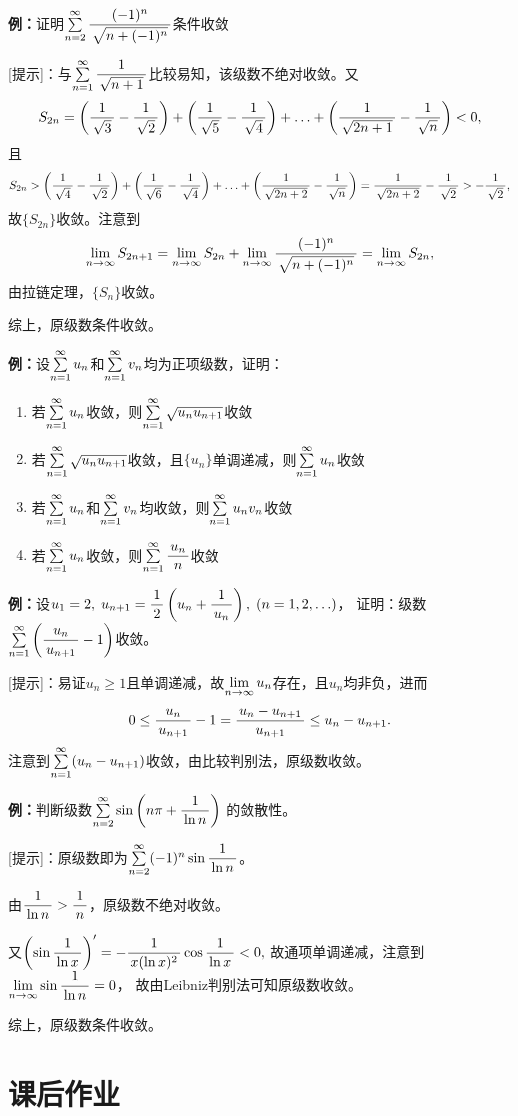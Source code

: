 {\bf 例：}证明$\sum\limits_{n=2}^{\infty}\df{(-1)^n}{\sqrt{n+(-1)^n}}$条件收敛

[提示]：与$\sumn\df1{\sqrt{n+1}}$比较易知，该级数不绝对收敛。又
$$S_{2n}=\left(\df1{\sqrt{3}}-\df1{\sqrt{2}}\right)
+\left(\df1{\sqrt{5}}-\df1{\sqrt{4}}\right)+\ldots
+\left(\df1{\sqrt{2n+1}}-\df1{\sqrt{n}}\right)<0,$$
且
$$S_{2n}>\left(\df1{\sqrt{4}}-\df1{\sqrt{2}}\right)
+\left(\df1{\sqrt{6}}-\df1{\sqrt{4}}\right)+\ldots
+\left(\df1{\sqrt{2n+2}}-\df1{\sqrt{n}}\right)
=\df1{\sqrt{2n+2}}-\df1{\sqrt{2}}>-\df1{\sqrt{2}},$$
故$\{S_{2n}\}$收敛。注意到
$$\limn S_{2n+1}=\limn S_{2n}+\limn\df{(-1)^n}{\sqrt{n+(-1)^n}}=\limn S_{2n},$$
由拉链定理，$\{S_n\}$收敛。

综上，原级数条件收敛。

{\bf 例：}设$\sumn u_n$和$\sumn v_n$均为正项级数，证明：
\begin{enumerate}[(1)]
  \setlength{\itemindent}{1cm}
  \item 若$\sumn u_n$收敛，则$\sumn\sqrt{u_nu_{n+1}}$收敛
  \item 若$\sumn\sqrt{u_nu_{n+1}}$收敛，且$\{u_n\}$单调递减，则$\sumn u_n$收敛
  \item 若$\sumn u_n$和$\sumn v_n$均收敛，则$\sumn u_nv_n$收敛
  \item 若$\sumn u_n$收敛，则$\sumn \df{u_n}n$收敛
\end{enumerate}

{\bf 例：}设$u_1=2,\;u_{n+1}=\df12\left(u_n+\df1{u_n}\right),\;(n=1,2,\ldots)$，
证明：级数$\sumn\left(\df{u_n}{u_{n+1}}-1\right)$收敛。

[提示]：易证$u_n\geq 1$且单调递减，故$\limn u_n$存在，且$u_n$均非负，进而
$$0\leq\df{u_n}{u_{n+1}}-1=\df{u_n-u_{n+1}}{u_{n+1}}\leq u_n-u_{n+1}.$$
注意到$\sumn(u_n-u_{n+1})$收敛，由比较判别法，原级数收敛。

{\bf 例：}判断级数$\sum\limits_{n=2}^{\infty}\sin\left(n\pi+\df1{\ln n}\right)$
的敛散性。

[提示]：原级数即为$\sum\limits_{n=2}^{\infty}(-1)^n\sin\df1{\ln n}$。

由$\df1{\ln n}>\df1n$，原级数不绝对收敛。

又$\left(\sin\df1{\ln x}\right)'=-\df1{x(\ln x)^2}\cos\df1{\ln x}<0,$
故通项单调递减，注意到$\limn\sin\df1{\ln n}=0$，
故由Leibniz判别法可知原级数收敛。

综上，原级数条件收敛。

\newpage

\section*{课后作业}

